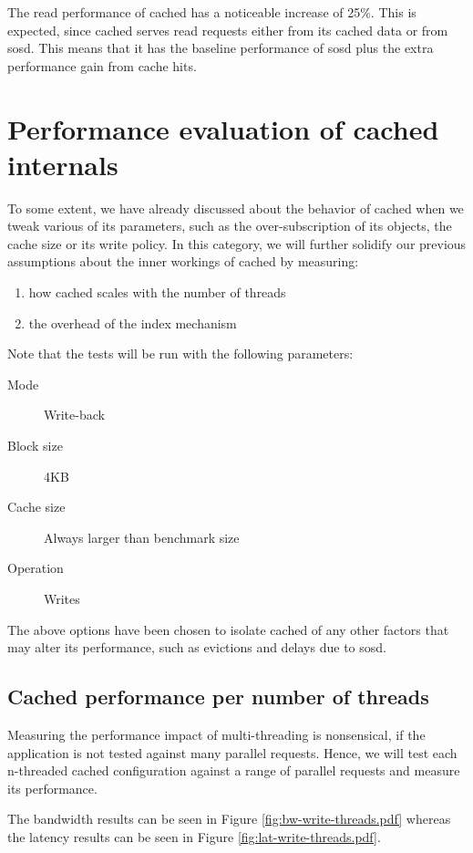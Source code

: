 The read performance of cached has a noticeable increase of 25\%. This is 
expected, since cached serves read requests either from its cached data or from 
sosd. This means that it has the baseline performance of sosd plus the extra 
performance gain from cache hits.

\section{Performance evaluation of cached internals}

To some extent, we have already discussed about the behavior of cached when we 
tweak various of its parameters, such as the over-subscription of its objects, 
the cache size or its write policy. In this category, we will further solidify 
our previous assumptions about the inner workings of cached by measuring:

\begin{enumerate}
	\item how cached scales with the number of threads
	\item the overhead of the index mechanism
\end{enumerate}

Note that the tests will be run with the following parameters:

\begin{description}
	\item[Mode] Write-back
	\item[Block size] 4KB
	\item[Cache size] Always larger than benchmark size
	\item[Operation] Writes
\end{description}

The above options have been chosen to isolate cached of any other factors that 
may alter its performance, such as evictions and delays due to sosd.

\subsection{Cached performance per number of threads}

Measuring the performance impact of multi-threading is nonsensical, if the 
application is not tested against many parallel requests. Hence, we will test 
each n-threaded cached configuration against a range of parallel requests and 
measure its performance.

The bandwidth results can be seen in Figure \ref{fig:bw-write-threads.pdf} 
whereas the latency results can be seen in Figure 
\ref{fig:lat-write-threads.pdf}.

